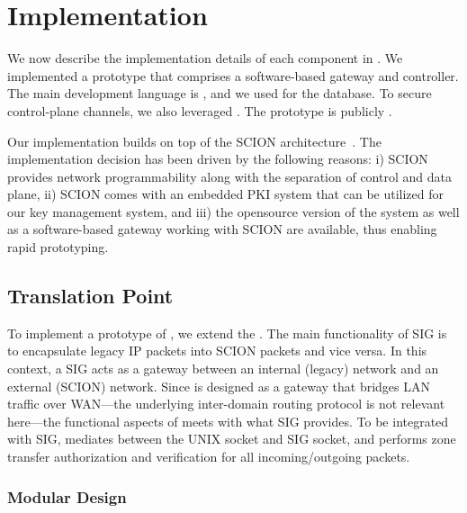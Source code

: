 \chapter{Implementation}
\label{impl}


We now describe the implementation details of each component in \name.
We implemented a prototype that comprises a software-based gateway and controller.
The main development language is , and we used  for the database. To secure control-plane channels, we also leveraged
. The prototype is publicly .

Our implementation builds on top of the SCION architecture~\cite{Perrig2017}.
The implementation decision has been driven by the following reasons: i) SCION provides
network programmability along with the separation of control and data plane, ii) SCION comes
with an embedded PKI system that can be utilized for our key management system, and
iii) the opensource version of the  system as well as a
software-based gateway working with SCION are available, thus enabling rapid prototyping.


\section{Translation Point}
\label{sec:tp}

To implement a prototype of \tp, we extend the .
The main functionality of SIG is to encapsulate legacy IP packets into SCION packets and
vice versa. In this context, a SIG acts as a gateway between an internal (legacy) network
and an external (SCION) network. Since \tp is designed as a gateway that bridges LAN
traffic over WAN---the underlying inter-domain routing protocol is not relevant here---the
functional aspects of \tp meets with what SIG provides. To be integrated with SIG, \tp
mediates between the UNIX socket and SIG socket, and performs zone transfer authorization
and verification for all incoming/outgoing packets.

\subsection{Modular Design}
\label{ssec:mod_design}

